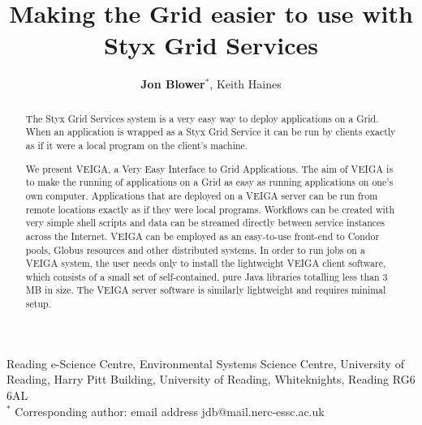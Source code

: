 \documentclass[a4paper]{article}
\begin{document}
\title{Making the Grid easier to use with Styx Grid Services}

\author{\textbf{Jon Blower$^{*}$}, Keith Haines}
\date{}

\maketitle

\begin{center}
Reading e-Science Centre, Environmental Systems Science Centre, University of Reading, Harry Pitt Building, University of Reading, Whiteknights, Reading RG6 6AL \\
\medskip
$^{*}$ Corresponding author: email address jdb@mail.nerc-essc.ac.uk
\end{center}

\bigskip

\begin{abstract}
The Styx Grid Services system is a very easy way to deploy applications on a Grid.  When an application is wrapped as a Styx Grid Service it can be run by clients exactly as if it were a local program on the client's machine.  

We present VEIGA, a Very Easy Interface to Grid Applications.  The aim of VEIGA is to make the running of applications on a Grid as easy as running applications on one's own computer.  Applications that are deployed on a VEIGA server can be run from remote locations exactly as if they were local programs.  Workflows can be created with very simple shell scripts and data can be streamed directly between service instances across the Internet.  VEIGA can be employed as an easy-to-use front-end to Condor pools, Globus resources and other distributed systems.  In order to run jobs on a VEIGA system, the user needs only to install the lightweight VEIGA client software, which consists of a small set of self-contained, pure Java libraries totalling less than 3 MB in size.  The VEIGA server software is similarly lightweight and requires minimal setup.
\end{abstract}

\bigskip
\end{document}
